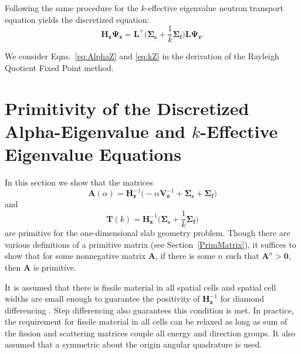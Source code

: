 Following the same procedure for the $k$-effective eigenvalue neutron transport equation yields the discretized equation:
\begin{equation}
	\boxed{\mathbf{H_{z}} \mathbf{\Psi_{z}} = \mathbf{L}^{+} \bigg ( \mathbf{\Sigma_{s}} + \frac{1}{k}\mathbf{\Sigma_{f}} \bigg ) \mathbf{L} \mathbf{\Psi_{z}}.}
	\label{eq:kZ}
\end{equation}

We consider Eqns.~\ref{eq:AlphaZ} and \ref{eq:kZ} in the derivation of the Rayleigh Quotient Fixed Point method.


%

\section{Primitivity of the Discretized Alpha-Eigenvalue and $k$-Effective Eigenvalue Equations}
\label{sec:PrimPos}

In this section we show that the matrices 
\begin{equation}
\mathbf{A}(\alpha) = \mathbf{H}_{\mathbf{z}}^{-1} \big (-\alpha \mathbf{V}_{\mathbf{z}}^{-1} + \mathbf{\Sigma_{s}} + \mathbf{\Sigma_{f}} \big)
\end{equation}
and
\begin{equation}
\mathbf{T}(k) = \mathbf{H}_{\mathbf{z}}^{-1} \bigg (\mathbf{\Sigma_{s}} + \frac{1}{k}\mathbf{\Sigma_{f}} \bigg)
\end{equation}
are primitive for the one-dimensional slab geometry problem. Though there are various definitions of a primitive matrix (see Section~\ref{PrimMatrix}), it suffices to show that for some nonnegative matrix $\mathbf{A}$, if there is some $n$ such that $\mathbf{A}^{n} > \mathbf{0}$, then $\mathbf{A}$ is primitive.

It is assumed that there is fissile material in all spatial cells and spatial cell widths are small enough to guarantee the positivity of $\mathbf{H}_{\mathbf{z}}^{-1}$ for diamond differencing \cite{greenbaum1997iterative}. Step differencing also guarantees this condition is met. In practice, the requirement for fissile material in all cells can be relaxed as long as sum of the fission and scattering matrices couple all energy and direction groups. It also assumed that a symmetric about the origin angular quadrature is used.

